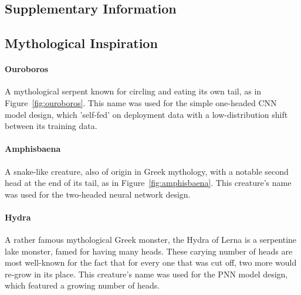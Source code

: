 \begin{uomappendix}
        \section{Supplementary Information}
    
            \subsection{Mythological Inspiration} \label{app:Greek}
    
                \paragraph{Ouroboros} A mythological serpent known for circling and eating its own tail, as in Figure~\ref{fig:ouroboros}. This name was used for the simple one-headed CNN model design, which 'self-fed' on deployment data with a low-distribution shift between its training data.
    
                \paragraph{Amphisbaena} A snake-like creature, also of origin in Greek mythology, with a notable second head at the end of its tail, as in Figure~\ref{fig:amphisbaena}. This creature's name was used for the two-headed neural network design.
    
                \paragraph{Hydra} A rather famous mythological Greek monster, the Hydra of Lerna is a serpentine lake monster, famed for having many heads. These carying number of heads are most well-known for the fact that for every one that was cut off, two more would re-grow in its place. This creature's name was used for the PNN model design, which featured a growing number of heads.
    

\end{uomappendix}
